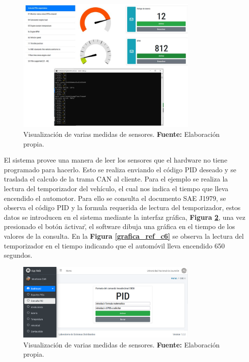 \begin{figure}[H]
	\centering
	\includegraphics[width=0.8\textwidth]{./Cap6imagen/dash_fig_c6.jpg}
	\caption [Visualización de varias medidas de sensores.]{Visualización de varias medidas de sensores.  \textbf{ Fuente:} %
		Elaboración propia.}
	\label{dash_ref_c6} %
\end{figure}


El sistema provee una manera de leer los sensores que el hardware no tiene programado para hacerlo. Esto se realiza enviando el código PID deseado y  se traslada el calculo de la trama CAN al cliente. 
Para el ejemplo se realiza la lectura del temporizador del vehículo, el cual nos indica el tiempo que lleva encendido el automotor. 
Para ello se consulta el documento SAE J1979, se observa el código PID y la formula requerida de lectura del temporizador, estos datos se introducen en el sistema mediante la interfaz gráfica, \textbf{Figura \ref{consulta_ref_c6}}, una vez presionado el botón \"activar\", el software dibuja  una gráfica en el tiempo de los valores de la consulta. En la \textbf{Figura \ref{grafica_ref_c6}} se observa la lectura del temporizador en el tiempo indicando que el automóvil lleva encendido 650 segundos. 

\begin{figure}[H]
	\centering
	\includegraphics[width=0.8\textwidth]{./Cap6imagen/consulta_fig_c6.png}
	\caption [Visualización de varias medidas de sensores.]{Visualización de varias medidas de sensores.  \textbf{ Fuente:} %
		Elaboración propia.}
	\label{consulta_ref_c6} %
\end{figure}

